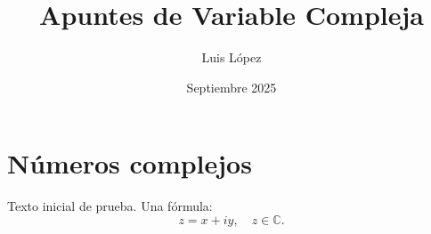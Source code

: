 \documentclass[a4paper,12pt]{article}
\title{Apuntes de Variable Compleja}
\author{Luis López}
\date{Septiembre 2025}
\begin{document}
\maketitle
\newpage
\tableofcontents
\newpage

\section{Números complejos}
Texto inicial de prueba. Una fórmula:
\[
z = x+iy, \quad z \in \mathbb{C}.
\]
\end{document}
